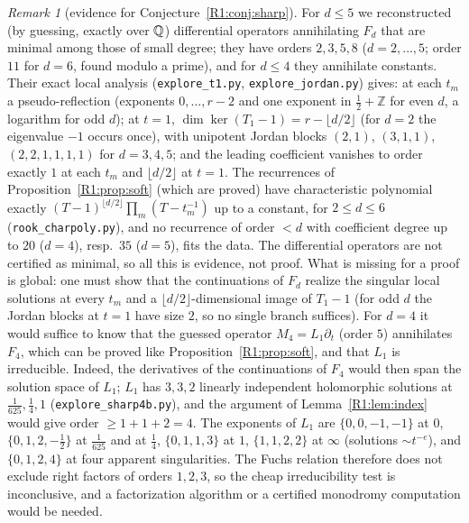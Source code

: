 \documentclass[11pt]{amsart}
\theoremstyle{definition}
\theoremstyle{remark}
\newtheorem{remark}[theorem]{Remark}
\begin{document}
\begin{remark}[evidence for Conjecture~\ref{R1:conj:sharp}]\label{R1:rem:evidence}
For $d\le5$ we reconstructed (by guessing, exactly over $\mathbb{Q}$) differential operators
annihilating $F_d$ that are minimal among those of small degree; they have orders $2,3,5,8$
($d=2,\dots,5$; order $11$ for $d=6$, found modulo a prime), and for $d\le4$ they annihilate
constants. Their exact local analysis
(\texttt{explore\_\allowbreak{}t1.py}, \texttt{explore\_\allowbreak{}jordan.py}) gives: at each $t_m$ a pseudo-reflection
(exponents $0,\dots,r-2$ and one exponent in $\frac12+\mathbb{Z}$ for even $d$, a logarithm for
odd $d$); at $t=1$, $\dim\ker(T_1-1)=r-\lfloor d/2\rfloor$ (for $d=2$ the eigenvalue $-1$ occurs once),
with unipotent Jordan blocks $(2,1)$, $(3,1,1)$, $(2,2,1,1,1,1)$ for $d=3,4,5$; and the leading coefficient vanishes to order exactly $1$ at each $t_m$ and
$\lfloor d/2\rfloor$ at $t=1$. The recurrences of Proposition~\ref{R1:prop:soft} (which are
proved) have characteristic polynomial exactly $(T-1)^{\lfloor d/2\rfloor}\prod_m(T-t_m^{-1})$
up to a constant, for $2\le d\le6$ (\texttt{rook\_\allowbreak{}charpoly.py}), and no recurrence of order
$<d$ with coefficient degree up to $20$ ($d=4$), resp.\ $35$ ($d=5$), fits the data. The
differential operators are not certified as minimal, so all this is evidence, not proof. What is missing for a proof is global:
one must show that the continuations of $F_d$ realize the singular local solutions at every
$t_m$ and a $\lfloor d/2\rfloor$-dimensional image of $T_1-1$ (for odd $d$ the Jordan
blocks at $t=1$ have size $2$, so no single branch suffices). For $d=4$ it would suffice to
know that the guessed operator $M_4=L_1\partial_t$ (order $5$) annihilates $F_4$, which can be
proved like Proposition~\ref{R1:prop:soft}, and that $L_1$ is irreducible. Indeed, the
derivatives of the continuations of $F_4$ would then span the solution space of $L_1$; $L_1$
has $3,3,2$ linearly independent holomorphic solutions at $\frac1{625},\frac14,1$
(\texttt{explore\_\allowbreak{}sharp4b.py}), and the argument of Lemma~\ref{R1:lem:index} would give
order $\ge1+1+2=4$. The exponents of
$L_1$ are $\{0,0,-1,-1\}$ at $0$, $\{0,1,2,-\frac12\}$ at $\frac1{625}$ and at $\frac14$,
$\{0,1,1,3\}$ at $1$, $\{1,1,2,2\}$ at $\infty$ (solutions $\sim t^{-e}$), and $\{0,1,2,4\}$ at
four apparent singularities. The Fuchs relation therefore does not exclude right factors of
orders $1,2,3$, so the cheap irreducibility test is inconclusive, and a factorization algorithm
or a certified monodromy computation would be needed.
\end{remark}
\end{document}
